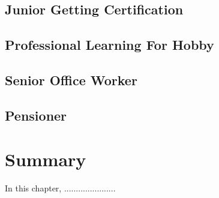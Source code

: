 \subsection{Junior Getting Certification}

\subsection{Professional Learning For Hobby}

\subsection{Senior Office Worker}

\subsection{Pensioner}


\section{Summary}
In this chapter, ......................
